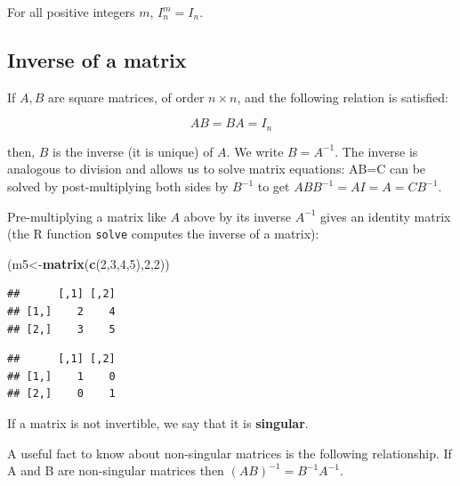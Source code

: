 \documentclass[12pt,]{krantz}
\newenvironment{Shaded}{\begin{snugshade}}{\end{snugshade}}
\newcommand{\DecValTok}[1]{\textcolor[rgb]{0.00,0.00,0.81}{#1}}
\newcommand{\KeywordTok}[1]{\textcolor[rgb]{0.13,0.29,0.53}{\textbf{#1}}}
\newcommand{\NormalTok}[1]{#1}
\newcommand{\OperatorTok}[1]{\textcolor[rgb]{0.81,0.36,0.00}{\textbf{#1}}}
\begin{document}
For all positive integers \(m\), \(I_n^m = I_n\).

\hypertarget{inverse-of-a-matrix}{%
\subsection{Inverse of a matrix}\label{inverse-of-a-matrix}}

If \(A,B\) are square matrices, of order \(n\times n\), and the following relation is satisfied:

\begin{equation}
AB = BA= I_n
\end{equation}

then, \(B\) is the inverse (it is unique) of \(A\). We write \(B=A^{-1}\). The inverse is analogous to division and allows us to solve matrix equations: AB=C can be solved by post-multiplying both sides by \(B^{-1}\) to get \(ABB^{-1}=AI=A=CB^{-1}\).

Pre-multiplying a matrix like \(A\) above by its inverse \(A^{-1}\) gives an identity matrix (the R function \texttt{solve} computes the inverse of a matrix):

\begin{Shaded}
\begin{Highlighting}[]
\NormalTok{(m5<-}\KeywordTok{matrix}\NormalTok{(}\KeywordTok{c}\NormalTok{(}\DecValTok{2}\NormalTok{,}\DecValTok{3}\NormalTok{,}\DecValTok{4}\NormalTok{,}\DecValTok{5}\NormalTok{),}\DecValTok{2}\NormalTok{,}\DecValTok{2}\NormalTok{))}
\end{Highlighting}
\end{Shaded}

\begin{verbatim}
##      [,1] [,2]
## [1,]    2    4
## [2,]    3    5
\end{verbatim}

\begin{Shaded}
\end{Shaded}

\begin{verbatim}
##      [,1] [,2]
## [1,]    1    0
## [2,]    0    1
\end{verbatim}

If a matrix is not invertible, we say that it is \textbf{singular}.

A useful fact to know about non-singular matrices is the following relationship. If A and B are non-singular matrices then \((AB)^{-1} = B^{-1}A^{-1}\).
\end{document}
